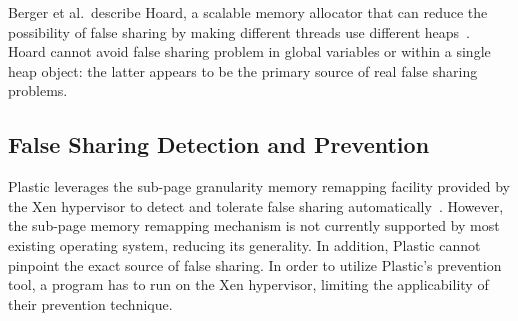 Berger et al.\ describe Hoard, a scalable memory allocator that can reduce the possibility of false sharing by making different threads use different heaps~\cite{Hoard}. Hoard cannot avoid false sharing problem in global variables or within
a single heap object: the latter appears to be the primary source of real false sharing problems.

\subsection{False Sharing Detection and Prevention}

Plastic leverages the sub-page granularity memory remapping facility provided by the Xen hypervisor to detect and tolerate false sharing automatically~\cite{OSdetection}. However, the sub-page memory remapping mechanism is not currently supported by most existing operating system, reducing its generality. In addition, Plastic cannot pinpoint the exact source of false sharing.  
In order to utilize Plastic's prevention tool, a program has to run on the Xen hypervisor, limiting the applicability of their prevention technique.

